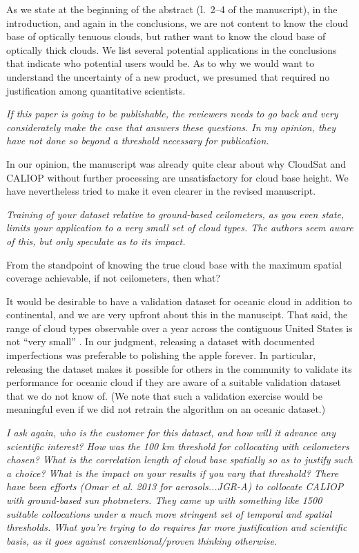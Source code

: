 \documentclass[12pt,a4paper]{responses}
\newcommand{\commentjm}[1]{\todo[inline, color=red!50]{$j_\mu$: #1}}
\begin{document}
As we state at the beginning of the abstract (l.~2--4 of the manuscript), in the
introduction, and again in the conclusions, we are not content to know the cloud
base of optically tenuous clouds, but rather want to know the cloud base of
optically thick clouds.  We list several potential applications in the
conclusions that indicate who potential users would be.  As to why we would want
to understand the uncertainty of a new product, we presumed that required no
justification among quantitative scientists. 

\textit{If this paper is going to be publishable, the reviewers needs
to go back and very considerately make the case that answers these questions. In my
opinion, they have not done so beyond a threshold necessary for publication.}

In our opinion, the manuscript was already quite clear about why CloudSat and
CALIOP without further processing are unsatisfactory for cloud base height.  We
have nevertheless tried to make it even clearer in the revised manuscript.

\textit{Training of your dataset relative to ground-based ceilometers, as you
  even state, limits your application to a very small set of cloud types. The
  authors seem aware of this, but only speculate as to its impact.}

From the standpoint of knowing the true cloud base with the maximum spatial
coverage achievable, if not ceilometers, then what?  

It would be desirable to have a validation dataset for oceanic cloud in addition
to continental, and we are very upfront about this in the manuscipt.  That said,
the range of cloud types observable over a year across the contiguous United
States is not ``very small'' \commentjm{if anyone has a good citation here, that
  would be great}.  In our judgment, releasing a dataset with documented
imperfections was preferable to polishing the apple forever.  In particular,
releasing the dataset makes it possible for others in the community to validate
its performance for oceanic cloud if they are aware of a suitable validation
dataset that we do not know of.  (We note that such a validation exercise would
be meaningful even if we did not retrain the algorithm on an oceanic dataset.)

\textit{I ask again, who is the customer for this dataset, and how will it
  advance any scientific interest? How was the 100 km threshold for collocating
with ceilometers chosen?  What is the correlation length of cloud base spatially so as
to justify such a choice? What is the impact on your results if you vary that threshold?
There have been efforts (Omar et al. 2013 for aerosols...JGR-A) to collocate CALIOP
with ground-based sun photmeters.  They came up with something like 1500 suitable
collocations under a much more stringent set of temporal and spatial thresholds. What
you’re trying to do requires far more justification and scientific basis, as it goes against
conventional/proven thinking otherwise.}
\end{document}
